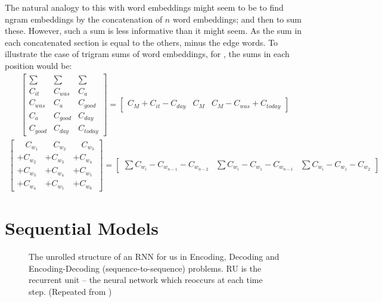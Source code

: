 \documentclass[12pt,parskip]{komatufte}
\begin{document}
The natural analogy to this with word embeddings might seem to be to find ngram embeddings by the concatenation of $n$ word embeddings; and then to sum these.
However, such a sum is less informative than it might seem.
As the sum in each concatenated section is equal to the others, minus the edge words. To illustrate the case of trigram sums of word embeddings, for ,
the sums in each position would be:
\begin{align}
\left[\begin{array}{c|c|c}
	\sum & \sum & \sum\\
	C_{it} & C_{was} & C_{a}\\
	C_{was} & C_{a} & C_{good}\\
	C_{a} & C_{good} & C_{day}\\
	C_{good} & C_{day} & C_{today}
\end{array}\right]=\left[\begin{array}{c|c|c}
	C_{M}+C_{it}-C_{day} & C_{M} & C_{M}-C_{was}+C_{today}\end{array}\right]
\end{align}
\begin{align}
\left[\begin{array}{c|c|c}
	\quad C_{w_{1}} & \quad C_{w_{2}} & \quad C_{w_{3}}\\
	+C_{w_{2}} & +C_{w_{3}} & +C_{w_{4}}\\
	+C_{w_{3}} & +C_{w_{4}} & +C_{w_{5}}\\
	+C_{w_{4}} & +C_{w_{5}} & +C_{w_{6}}
\end{array}\right]=\left[\begin{array}{c|c|c}
	\sum C_{w_{i}}-C_{w_{n-1}}-C_{w_{n-2}} & \sum C_{w_{i}}-C_{w_{1}}-C_{w_{n-1}} & \sum C_{w_{i}}-C_{w_{1}}-C_{w_{2}}\end{array}\right]
\end{align}


\section{Sequential Models}

\begin{figure}
	\caption{The unrolled structure of an RNN for us in Encoding, Decoding and Encoding-Decoding (sequence-to-sequence) problems. RU is the recurrent unit -- the neural network which reoccurs at each time step. (Repeated from )
	}
	
	\label{fig-rnns-sq}
	
	\resizebox{\textwidth}{!}{}
\end{figure}
\end{document}

